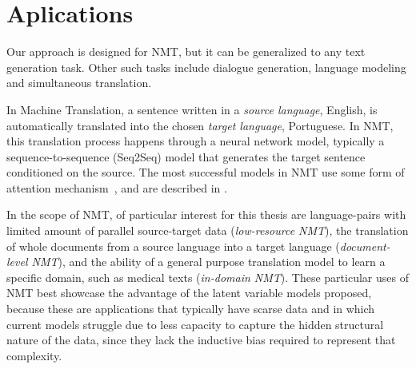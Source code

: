\section{Aplications}
\label{sec:int_applications}

Our approach is designed for NMT, but it can be generalized to any
text generation task. Other such tasks include dialogue generation,
language modeling and simultaneous translation.

In Machine Translation, a sentence written in a {\it source
language}, \eg English, is automatically translated into the chosen
{\it target language}, \eg Portuguese. In NMT, this translation
process happens through a neural network model, typically a
sequence-to-sequence (Seq2Seq) model that generates the target
sentence conditioned on the source. The most successful models in NMT
use some form of attention
mechanism~\citep{bahdanau2014neural,vaswani2017attention}, and are
described in .

In the scope of NMT, of particular interest for this thesis are
language-pairs with limited amount of parallel source-target data
({\it low-resource NMT}), the translation of whole documents from a
source language into a target language ({\it document-level NMT}),
and the ability of a general purpose translation model to learn a
specific domain, such as medical texts ({\it in-domain NMT}). These
particular uses of NMT best showcase the advantage of the latent
variable models proposed, because these are applications that
typically have scarse data and in which current models struggle due
to less capacity to capture the hidden structural nature of the data,
since they lack the inductive bias required to represent that
complexity.